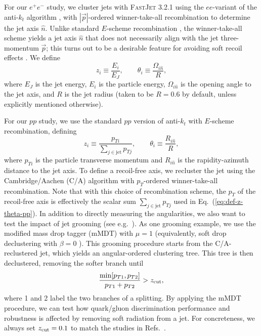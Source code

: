\documentclass[11pt,letterpaper]{article}
\DeclareRobustCommand{\Eq}[1]{Eq.~(\ref{#1})}
\DeclareRobustCommand{\Refs}[1]{Refs.~\cite{#1}}
\newcommand{\be}{\begin{equation}}
\newcommand{\ee}{\end{equation}}
\begin{document}
For our $e^+ e^-$ study, we cluster jets with \textsc{FastJet 3.2.1} \cite{Cacciari:2005hq,Cacciari:2011ma} using the $ee$-variant of the
anti-$k_t$ algorithm \cite{Cacciari:2008gp}, with $|\vec{p}|$-ordered
winner-take-all recombination
\cite{Larkoski:2014uqa,Bertolini:2013iqa,Salam:WTAUnpublished} to
determine the jet axis $\hat{n}$.  Unlike standard $E$-scheme
recombination \cite{Blazey:2000qt}, the winner-take-all scheme yields
a jet axis $\hat{n}$ that does not necessarily align with the jet
three-momentum $\vec{p}$; this turns out to be a desirable feature
for avoiding soft recoil effects
\cite{Larkoski:2013eya,Larkoski:2014uqa,Catani:1992jc,Dokshitzer:1998kz,Banfi:2004yd}.  We define
\begin{equation}
z_i \equiv \frac{E_i}{E_{J}}, \qquad \theta_i \equiv \frac{\Omega_{i \hat{n}}}{R},
\end{equation}
where $E_J$ is the jet energy, $E_i$ is the particle energy, $\Omega_{i \hat{n}}$ is the
opening angle to the jet axis, and $R$ is the jet radius (taken to be
$R = 0.6$ by default, unless explicitly mentioned otherwise).

For our $pp$ study, we use the standard $pp$ version of anti-$k_t$ with  $E$-scheme recombination, defining
\begin{equation}\label{eq:def-z-theta-pp}
z_i \equiv \frac{p_{Ti}}{\sum_{j \in \text{jet}} p_{Tj}}, \qquad \theta_i \equiv \frac{R_{i \hat{n}}}{R},
\end{equation}
where $p_{Ti}$ is the particle transverse momentum and $R_{i \hat{n}}$
is the rapidity-azimuth distance to the jet axis.  To define a
recoil-free axis, we recluster the jet using the Cambridge/Aachen
(C/A) algorithm \cite{Dokshitzer:1997in,Wobisch:1998wt} with
$p_T$-ordered winner-take-all recombination. Note that with this
choice of recombination scheme, the $p_T$ of the recoil-free axis is effectively
the scalar sum $\sum_{j \in \text{jet}} p_{Tj}$ used in
\Eq{eq:def-z-theta-pp}. In addition to directly measuring the
angularities, we also want to test the impact of jet grooming (see
e.g.~\cite{Butterworth:2008iy,Ellis:2009su,Ellis:2009me,Krohn:2009th}).
As one grooming example, we use the modified mass drop tagger (mMDT)
with $\mu = 1$ \cite{Butterworth:2008iy,Dasgupta:2013ihk}
(equivalently, soft drop declustering with $\beta = 0$
\cite{Larkoski:2014wba}).  This grooming procedure starts from the
C/A-reclustered jet, which yields an angular-ordered clustering tree.
This tree is then declustered, removing the softer branch until \be
\label{eq:mMDTcriteria}
\frac{\min[p_{T1}, p_{T2}]}{p_{T1} + p_{T2}} > z_{\rm cut},
\ee
where 1 and 2 label the two branches of a splitting.  By applying the mMDT procedure, we can test how quark/gluon discrimination performance and robustness is affected by removing soft radiation from a jet.  For concreteness, we always set $z_{\rm cut} = 0.1$ to match the studies in \Refs{Larkoski:2014wba,Larkoski:2014bia,Larkoski:2015lea,CMS-PAS-HIN-16-006}.
\end{document}
